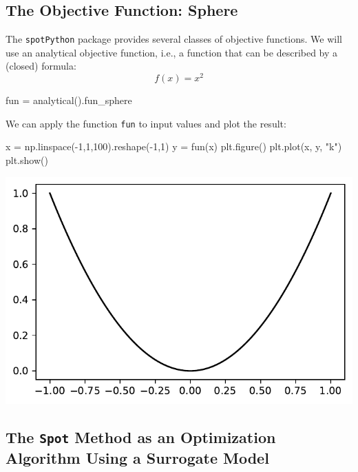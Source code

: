 \documentclass[
  letterpaper,
  DIV=11,
  numbers=noendperiod]{scrreprt}
\newenvironment{Shaded}{\begin{snugshade}}{\end{snugshade}}
\newcommand{\DecValTok}[1]{\textcolor[rgb]{0.68,0.00,0.00}{#1}}
\newcommand{\NormalTok}[1]{\textcolor[rgb]{0.00,0.23,0.31}{#1}}
\newcommand{\OperatorTok}[1]{\textcolor[rgb]{0.37,0.37,0.37}{#1}}
\newcommand{\StringTok}[1]{\textcolor[rgb]{0.13,0.47,0.30}{#1}}
\begin{document}
\subsection{The Objective Function:
Sphere}\label{the-objective-function-sphere}

The \texttt{spotPython} package provides several classes of objective
functions. We will use an analytical objective function, i.e., a
function that can be described by a (closed) formula: \[
f(x) = x^2
\]

\begin{Shaded}
\begin{Highlighting}[]
\NormalTok{fun }\OperatorTok{=}\NormalTok{ analytical().fun\_sphere}
\end{Highlighting}
\end{Shaded}

We can apply the function \texttt{fun} to input values and plot the
result:

\begin{Shaded}
\begin{Highlighting}[]
\NormalTok{x }\OperatorTok{=}\NormalTok{ np.linspace(}\OperatorTok{{-}}\DecValTok{1}\NormalTok{,}\DecValTok{1}\NormalTok{,}\DecValTok{100}\NormalTok{).reshape(}\OperatorTok{{-}}\DecValTok{1}\NormalTok{,}\DecValTok{1}\NormalTok{)}
\NormalTok{y }\OperatorTok{=}\NormalTok{ fun(x)}
\NormalTok{plt.figure()}
\NormalTok{plt.plot(x, y, }\StringTok{"k"}\NormalTok{)}
\NormalTok{plt.show()}
\end{Highlighting}
\end{Shaded}

\includegraphics{007_num_spot_intro_files/figure-pdf/cell-4-output-1.pdf}

\subsection{\texorpdfstring{The \texttt{Spot} Method as an Optimization
Algorithm Using a Surrogate
Model}{The Spot Method as an Optimization Algorithm Using a Surrogate Model}}\label{the-spot-method-as-an-optimization-algorithm-using-a-surrogate-model}
\end{document}
